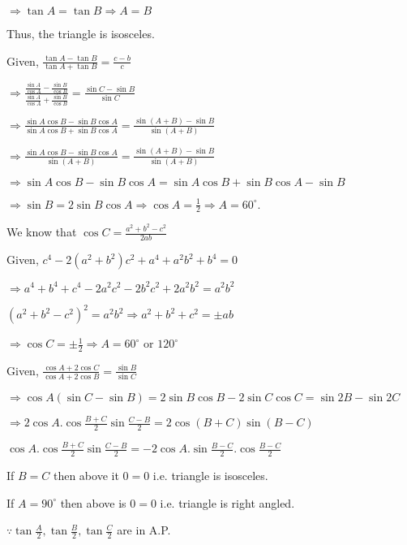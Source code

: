   $\Rightarrow \tan A = \tan B \Rightarrow A = B$

  Thus, the triangle is isosceles.

\item Given, $\frac{\tan A - \tan B}{\tan A + \tan B} = \frac{c - b}{c}$

  $\Rightarrow \frac{\frac{\sin A}{\cos A} - \frac{\sin B}{\cos B}}{\frac{\sin A}{\cos A} + \frac{\sin B}{\cos B}} =
  \frac{\sin C - \sin B}{\sin C}$

  $\Rightarrow \frac{\sin A\cos B - \sin B\cos A}{\sin A\cos B + \sin B\cos A} = \frac{\sin (A + B) - \sin B}{\sin (A + B)}$

  $\Rightarrow \frac{\sin A\cos B - \sin B\cos A}{\sin(A + B)} = \frac{\sin(A + B) - \sin B}{\sin(A + B)}$

  $\Rightarrow \sin A\cos B - \sin B\cos A = \sin A\cos B + \sin B\cos A - \sin B$

  $\Rightarrow \sin B = 2\sin B\cos A \Rightarrow \cos A = \frac{1}{2} \Rightarrow A = 60^\circ.$

\item We know that $\cos C = \frac{a^2 + b^2 - c^2}{2ab}$

  Given, $c^4 - 2(a^2 + b^2)c^2 + a^4 + a^2b^2 + b^4 = 0$

  $\Rightarrow a^4 + b^4 + c^4 - 2a^2c^2 - 2b^2c^2 + 2a^2b^2 = a^2b^2$

  $(a^2 + b^2 -c^2)^2 = a^2b^2 \Rightarrow a^2 + b^2 + c^2 = \pm ab$

  $\Rightarrow \cos C = \pm\frac{1}{2} \Rightarrow A = 60^\circ$ or $120^\circ$

\item Given, $\frac{\cos A + 2\cos C}{\cos A + 2\cos B} = \frac{\sin B}{\sin C}$

  $\Rightarrow \cos A(\sin C - \sin B) = 2\sin B\cos B - 2\sin C\cos C = \sin 2B - \sin 2C$

  $\Rightarrow 2\cos A.\cos\frac{B + C}{2}\sin\frac{C - B}{2} = 2\cos(B + C)\sin(B - C)$

  $\cos A.\cos\frac{B + C}{2}\sin\frac{C - B}{2} = -2\cos A.\sin\frac{B - C}{2}.\cos\frac{B - C}{2}$

  If $B = C$ then above it $0 = 0$ i.e. triangle is isosceles.

  If $A = 90^\circ$ then above is $0 =0$ i.e. triangle is right angled.

\item $\because \tan\frac{A}{2}, \tan\frac{B}{2}, \tan\frac{C}{2}$ are in A.P.

